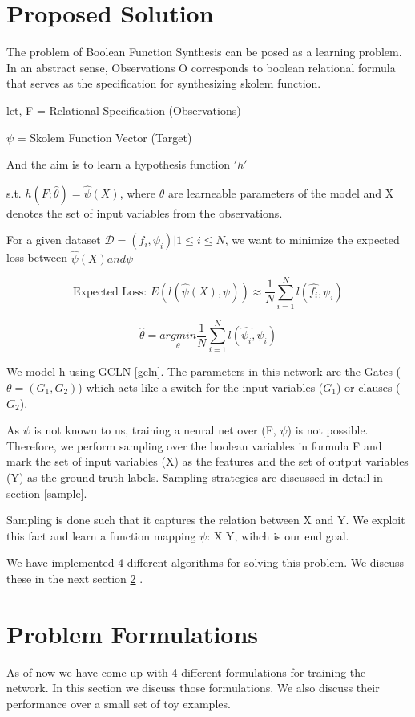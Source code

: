 \section{Proposed Solution}
The problem of Boolean Function Synthesis can be posed as a learning problem. 
In an abstract sense, Observations O corresponds to boolean relational formula 
that serves as the specification for synthesizing skolem function.

let, F = Relational Specification (Observations)

\tab $\psi$ = Skolem Function Vector (Target)

And the aim is to learn a hypothesis function $'h'$ 

s.t.  $h(F;\hat{\theta}) = \hat{\psi}(X)$, where $\theta$ are learneable parameters of the model and
X denotes the set of input variables from the observations.

For a given dataset $\mathcal{D} = {(f_i, \psi_i)|1 \leq i \leq N}$, we want to minimize the 
expected loss between $\hat{\psi}(X) and \psi$

$$\text{Expected Loss: } E(l(\hat{\psi}(X), \psi)) \approx \frac{1}{N} \sum_{i=1}^{N} l(\hat{f_i}, \psi_i) $$

$$\hat{\theta} = \underset{\theta}{argmin} \frac{1}{N} \sum_{i=1}^{N} l(\hat{\psi_i}, \psi_i)$$

We model h using GCLN \ref{gcln}. 
The parameters in this network are the Gates ($\theta = (G_1, G_2)$) which acts like a switch 
for the input variables ($G_{1}$) or clauses ($G_{2}$).

As $\psi$ is not known to us, training a neural net over (F, $\psi$) is not possible. Therefore,
we perform sampling over
the boolean variables in formula F and mark the set of input variables (X) as the features and 
the set of output variables 
(Y) as the ground truth labels. Sampling strategies are discussed in detail in section \ref{sample}.

Sampling is done such that it captures the relation between X and Y. We exploit this fact and learn 
a function mapping $\psi$: X \rightarrow Y, wihch is our end goal.

We have implemented 4 different algorithms for solving this problem. We discuss these in the next section
\ref{algo} .




\section{Problem Formulations}\label{algo}
As of now we have come up with 4 different formulations for training the network. 
In this section we discuss those formulations. 
We also discuss their performance over a small set of toy examples.

